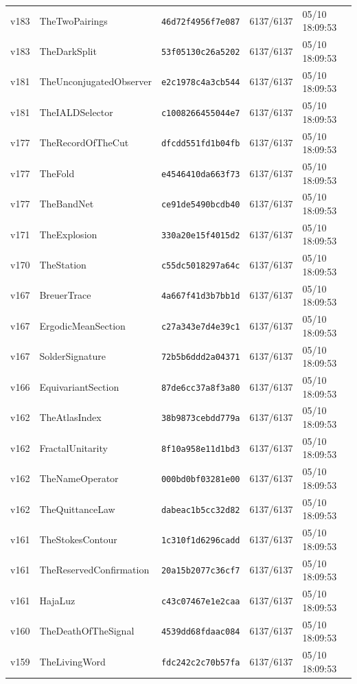 \documentclass[11pt]{article}
\theoremstyle{definition}\newtheorem{deriv}{Derivation}
\begin{document}
{\begin{longtable}{@{}lllll@{}}
v183 & TheTwoPairings & \texttt{46d72f4956f7e087} & 6137/6137 & 05/10 18:09:53 \\
v183 & TheDarkSplit & \texttt{53f05130c26a5202} & 6137/6137 & 05/10 18:09:53 \\
v181 & TheUnconjugatedObserver & \texttt{e2c1978c4a3cb544} & 6137/6137 & 05/10 18:09:53 \\
v181 & TheIALDSelector & \texttt{c1008266455044e7} & 6137/6137 & 05/10 18:09:53 \\
v177 & TheRecordOfTheCut & \texttt{dfcdd551fd1b04fb} & 6137/6137 & 05/10 18:09:53 \\
v177 & TheFold & \texttt{e4546410da663f73} & 6137/6137 & 05/10 18:09:53 \\
v177 & TheBandNet & \texttt{ce91de5490bcdb40} & 6137/6137 & 05/10 18:09:53 \\
v171 & TheExplosion & \texttt{330a20e15f4015d2} & 6137/6137 & 05/10 18:09:53 \\
v170 & TheStation & \texttt{c55dc5018297a64c} & 6137/6137 & 05/10 18:09:53 \\
v167 & BreuerTrace & \texttt{4a667f41d3b7bb1d} & 6137/6137 & 05/10 18:09:53 \\
v167 & ErgodicMeanSection & \texttt{c27a343e7d4e39c1} & 6137/6137 & 05/10 18:09:53 \\
v167 & SolderSignature & \texttt{72b5b6ddd2a04371} & 6137/6137 & 05/10 18:09:53 \\
v166 & EquivariantSection & \texttt{87de6cc37a8f3a80} & 6137/6137 & 05/10 18:09:53 \\
v162 & TheAtlasIndex & \texttt{38b9873cebdd779a} & 6137/6137 & 05/10 18:09:53 \\
v162 & FractalUnitarity & \texttt{8f10a958e11d1bd3} & 6137/6137 & 05/10 18:09:53 \\
v162 & TheNameOperator & \texttt{000bd0bf03281e00} & 6137/6137 & 05/10 18:09:53 \\
v162 & TheQuittanceLaw & \texttt{dabeac1b5cc32d82} & 6137/6137 & 05/10 18:09:53 \\
v161 & TheStokesContour & \texttt{1c310f1d6296cadd} & 6137/6137 & 05/10 18:09:53 \\
v161 & TheReservedConfirmation & \texttt{20a15b2077c36cf7} & 6137/6137 & 05/10 18:09:53 \\
v161 & HajaLuz & \texttt{c43c07467e1e2caa} & 6137/6137 & 05/10 18:09:53 \\
v160 & TheDeathOfTheSignal & \texttt{4539dd68fdaac084} & 6137/6137 & 05/10 18:09:53 \\
v159 & TheLivingWord & \texttt{fdc242c2c70b57fa} & 6137/6137 & 05/10 18:09:53 \\

\end{longtable}}
\end{document}
